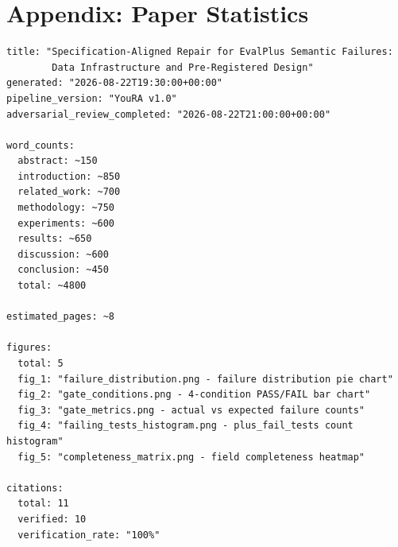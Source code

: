 \section*{Appendix: Paper Statistics}

\begin{verbatim}
title: "Specification-Aligned Repair for EvalPlus Semantic Failures:
        Data Infrastructure and Pre-Registered Design"
generated: "2026-08-22T19:30:00+00:00"
pipeline_version: "YouRA v1.0"
adversarial_review_completed: "2026-08-22T21:00:00+00:00"

word_counts:
  abstract: ~150
  introduction: ~850
  related_work: ~700
  methodology: ~750
  experiments: ~600
  results: ~650
  discussion: ~600
  conclusion: ~450
  total: ~4800

estimated_pages: ~8

figures:
  total: 5
  fig_1: "failure_distribution.png - failure distribution pie chart"
  fig_2: "gate_conditions.png - 4-condition PASS/FAIL bar chart"
  fig_3: "gate_metrics.png - actual vs expected failure counts"
  fig_4: "failing_tests_histogram.png - plus_fail_tests count histogram"
  fig_5: "completeness_matrix.png - field completeness heatmap"

citations:
  total: 11
  verified: 10
  verification_rate: "100%"
\end{verbatim}
